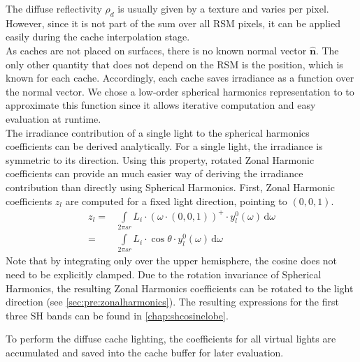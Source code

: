 \documentclass[thesis.tex]{subfiles}
\begin{document}
The diffuse reflectivity $\rho_d$ is usually given by a texture and varies per pixel.
However, since it is not part of the sum over all RSM pixels, it can be applied easily during the cache interpolation stage.\\
As caches are not placed on surfaces, there is no known normal vector $\hat{\mathbf{n}}$.
The only other quantity that does not depend on the RSM is the position, which is known for each cache.
Accordingly, each cache saves irradiance as a function over the normal vector.
We chose a low-order spherical harmonics representation to to approximate this function since it allows iterative computation and easy evaluation at runtime.\\ 
The irradiance contribution of a single light to the spherical harmonics coefficients can be derived analytically. 
For a single light, the irradiance is symmetric to its direction.
Using this property, rotated Zonal Harmonic coefficients can provide an much easier way of deriving the irradiance contribution than directly using Spherical Harmonics.
First, Zonal Harmonic coefficients $z_l$ are computed for a fixed light direction, pointing to $(0,0,1)$.
\begin{align}
z_l =&\int\limits_{2 \pi sr} L_i \cdot (\omega \cdot (0,0,1))^+ \cdot y^0_l(\omega) \,\mathrm{d}\omega\\
=&\int\limits_{2 \pi sr} L_i \cdot \cos\theta \cdot y^0_l(\omega) \,\mathrm{d}\omega
\end{align}
Note that by integrating only over the upper hemisphere, the cosine does not need to be explicitly clamped.
Due to the rotation invariance of Spherical Harmonics, the resulting Zonal Harmonics coefficients can be rotated to the light direction (see \autoref{sec:pre:zonalharmonics}).
The resulting expressions for the first three SH bands can be found in \autoref{chap:shcosinelobe}.

To perform the diffuse cache lighting, the coefficients for all virtual lights are accumulated and saved into the cache buffer for later evaluation. 
\end{document}
